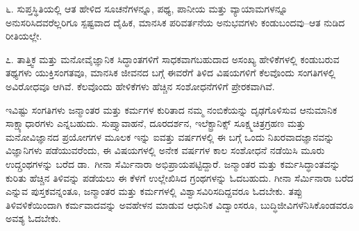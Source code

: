 ೬. ಸುಪ್ತಸ್ಥಿತಿಯಲ್ಲಿ ಆತ ಹೇಳಿದ ಸೂಚನೆಗಳನ್ನೂ, ಪಥ್ಯ, ಪಾನೀಯ ಮತ್ತು ವ್ಯಾಯಾಮಗಳನ್ನೂ ಅನುಸರಿಸಿದವರೆಲ್ಲರಿಗೂ ಸ್ಪಷ್ಟವಾದ ದೈಹಿಕ, ಮಾನಸಿಕ ಪರಿವರ್ತನೆಯ ಅನುಭವಗಳು ಕಂಡುಬಂದವು–ಆತ ನುಡಿದ ರೀತಿಯಲ್ಲೇ.

೭. ತಾತ್ತ್ವಿಕ ಮತ್ತು ಮನೋವೈಜ್ಞಾನಿಕ ಸಿದ್ಧಾಂತಗಳಿಗೆ ಸಾಧಕವಾಗಬಹುದಾದ ಅಸಂಖ್ಯ ಹೇಳಿಕೆಗಳಲ್ಲಿ ಕಂಡುಬರುವ ತಥ್ಯಗಳು ಯುಕ್ತಿಸಂಗತವೂ, ಮಾನಸಿಕ ಜೀವನದ ಬಗ್ಗೆ ಈವರೆಗೆ ತಿಳಿದ ವಿಷಯಗಳಿಗೆ ಕೆಲವೊಂದು ಸಂಗತಿಗಳಲ್ಲಿ ಅವಿರೋಧವೂ ಆಗಿವೆ. ಕೆಲವೊಂದು ಹೇಳಿಕೆಗಳು ಹೆಚ್ಚಿನ ಸಂಶೋಧನೆಗಳಿಗೆ ಪ್ರೇರಕವಾಗಿವೆ.

ಇವಿಷ್ಟು ಸಂಗತಿಗಳು ಜನ್ಮಾಂತರ ಮತ್ತು ಕರ್ಮಗಳ ಕುರಿತಾದ ನಮ್ಮ ನಂಬಿಕೆಯನ್ನು ದೃಢ\-ಗೊಳಿಸುವ ಆನುಮಾನಿಕ ಸಾಕ್ಷ್ಯಾಧಾರಗಳು  ಎನ್ನಬಹುದು. ಸುಪ್ತ್ಯಾವಾಹನೆ, ದೂರದರ್ಶನ, ಇಲೆಕ್ಟ್ರಾನಿಕ್ಸ್ ಸೂಕ್ಷ್ಮಚಿತ್ರಗ್ರಹಣ ಮತ್ತು ಮನೋ\-ವಿಜ್ಞಾನದ ಪ್ರಯೋಗಗಳ ಮೂಲಕ ಇನ್ನು ಐವತ್ತು ವರ್ಷಗಳಲ್ಲಿ ಈ ಬಗ್ಗೆ ಒಂದು ನಿಖರವಾದ\break ಜ್ಞಾನವನ್ನು ವಿಜ್ಞಾನಿಗಳು ಪಡೆಯುವರೆಂದು, ಈ ವಿಷಯಗಳಲ್ಲಿ ಅನೇಕ ವರ್ಷಗಳ ಕಾಲ ಸಂಶೋಧನೆ ನಡೆಯಿಸಿ ಮೂರು ಉದ್ಗ್ರಂಥಗಳನ್ನು ಬರೆದ ಡಾ.\ ಗೀನಾ ಸೆರ್ಮಿನಾರಾ ಅಭಿಪ್ರಾಯ\-ಪಟ್ಟಿದ್ದಾರೆ. ಜನ್ಮಾಂತರ ಮತ್ತು ಕರ್ಮಸಿದ್ಧಾಂತವನ್ನು ಕುರಿತು ಹೆಚ್ಚಿನ ತಿಳಿವನ್ನು ಪಡೆಯಲು ಈ ಕೆಳಗೆ ಉಲ್ಲೇಖಿಸಿದ ಗ್ರಂಥಗಳನ್ನು ಓದಬಹುದು. ಗೀನಾ ಸೆರ್ಮಿನಾರಾ ಬರೆದ  ಎನ್ನುವ ಪುಸ್ತಕವನ್ನಂತೂ, ಜನ್ಮಾಂತರ ಮತ್ತು ಕರ್ಮಗಳಲ್ಲಿ ವಿಶ್ವಾಸವಿರಿಸದಿದ್ದವರೂ ಓದಬೇಕು. ತಪ್ಪು ತಿಳಿವಳಿಕೆಯಿಂದಾಗಿ ಕರ್ಮವಾದವನ್ನು ಅವಹೇಳನ ಮಾಡುವ ಆಧುನಿಕ ವಿದ್ವಾಂಸರೂ, ಬುದ್ಧಿಜೀವಿಗಳೆನಿಸಿಕೊಂಡವರೂ ಅವಶ್ಯ ಓದಬೇಕು.


\vskip 1.2pt


\vskip 1.2pt


\vskip 1.2pt


\vskip 1.2pt


\vskip 1.2pt


\vskip 1.2pt





